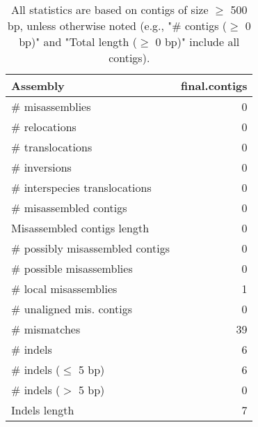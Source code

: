 \documentclass[12pt,a4paper]{article}
\begin{document}
\begin{table}[ht]
\begin{center}
\caption{All statistics are based on contigs of size $\geq$ 500 bp, unless otherwise noted (e.g., "\# contigs ($\geq$ 0 bp)" and "Total length ($\geq$ 0 bp)" include all contigs).}
\begin{tabular}{|l*{1}{|r}|}
\hline
Assembly & final.contigs \\ \hline
\# misassemblies & 0 \\ \hline
\hspace{5mm}\# relocations & 0 \\ \hline
\hspace{5mm}\# translocations & 0 \\ \hline
\hspace{5mm}\# inversions & 0 \\ \hline
\hspace{5mm}\# interspecies translocations & 0 \\ \hline
\# misassembled contigs & 0 \\ \hline
Misassembled contigs length & 0 \\ \hline
\# possibly misassembled contigs & 0 \\ \hline
\hspace{5mm}\# possible misassemblies & 0 \\ \hline
\# local misassemblies & 1 \\ \hline
\# unaligned mis. contigs & 0 \\ \hline
\# mismatches & 39 \\ \hline
\# indels & 6 \\ \hline
\hspace{5mm}\# indels ($\leq$ 5 bp) & 6 \\ \hline
\hspace{5mm}\# indels ($>$ 5 bp) & 0 \\ \hline
Indels length & 7 \\ \hline
\end{tabular}
\end{center}
\end{table}
\end{document}

